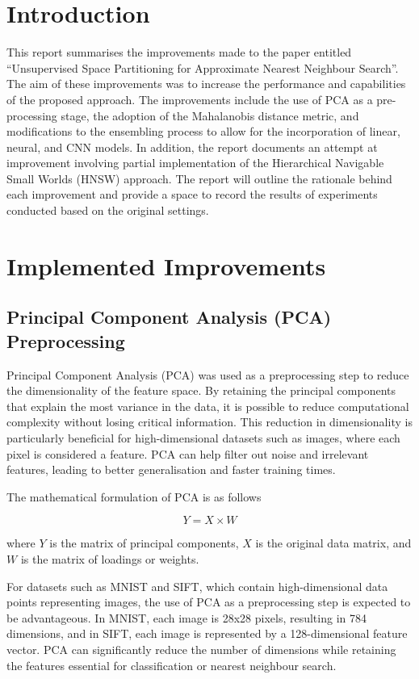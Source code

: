\documentclass[sigconf, nonacm]{acmart}
\begin{document}
\section{Introduction}
This report summarises the improvements made to the paper entitled ``Unsupervised Space Partitioning for Approximate Nearest Neighbour Search''. The aim of these improvements was to increase the performance and capabilities of the proposed approach. The improvements include the use of PCA as a pre-processing stage, the adoption of the Mahalanobis distance metric, and modifications to the ensembling process to allow for the incorporation of linear, neural, and CNN models. In addition, the report documents an attempt at improvement involving partial implementation of the Hierarchical Navigable Small Worlds (HNSW) approach. The report will outline the rationale behind each improvement and provide a space to record the results of experiments conducted based on the original settings.

\section{Implemented Improvements}

\subsection{Principal Component Analysis (PCA) Preprocessing}
Principal Component Analysis (PCA) \cite{pca-origin} was used as a preprocessing step to reduce the dimensionality of the feature space. By retaining the principal components that explain the most variance in the data, it is possible to reduce computational complexity without losing critical information. This reduction in dimensionality is particularly beneficial for high-dimensional datasets such as images, where each pixel is considered a feature. PCA can help filter out noise and irrelevant features, leading to better generalisation and faster training times.

The mathematical formulation of PCA is as follows

\begin{equation}
Y = X \times W
\end{equation}

where $Y$ is the matrix of principal components, $X$ is the original data matrix, and $W$ is the matrix of loadings or weights.

For datasets such as MNIST and SIFT, which contain high-dimensional data points representing images, the use of PCA as a preprocessing step is expected to be advantageous. In MNIST, each image is 28x28 pixels, resulting in 784 dimensions, and in SIFT, each image is represented by a 128-dimensional feature vector. PCA can significantly reduce the number of dimensions while retaining the features essential for classification or nearest neighbour search.
\end{document}
